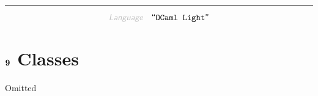 

\begin{center}
\rule{3in}{0.4pt}
\end{center}

\begin{displaymath}
\KEY{Language} \quad \STRING{OCaml Light}
\end{displaymath}

\section{$\SECT{9}$ Classes}\hypertarget{sect9-classes}{}\label{sect9-classes}

Omitted



